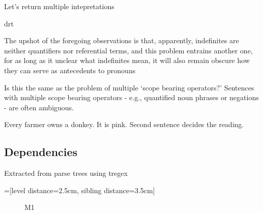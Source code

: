 \documentclass[12pt]{article}
\begin{document}
Let's return multiple intepretations

drt

The upshot of the foregoing observations is that, apparently, indefinites are neither quantifiers nor referential terms, and this problem entrains another one, for as long as it unclear what indefinites mean, it will also remain obscure how they can serve as antecedents to pronouns

Is this the same as the problem of multiple `scope bearing operators?'
Sentences with multiple scope bearing operators - e.g.,
quantified noun phrases or negations - are often ambiguous.


Every farmer owns a donkey. It is pink. Second sentence decides the reading.

\subsection{Dependencies}

Extracted from parse trees using tregex\cite{de2006generating}

=[level distance=2.5cm, sibling distance=3.5cm]
\begin{figure}
\centering
{}
\caption{M1} \label{fig:M1}
\end{figure}
\end{document}
